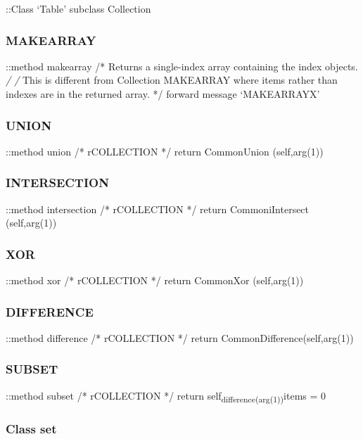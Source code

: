 ::Class `Table' subclass Collection

\hypertarget{makearray}{%
\subsubsection{MAKEARRAY}\label{makearray}}

::method makearray /* Returns a single-index array containing the index
objects. \emph{/ /} This is different from Collection MAKEARRAY where
items rather than indexes are in the returned array. */ forward message
`MAKEARRAYX'

\hypertarget{union}{%
\subsubsection{UNION}\label{union}}

::method union /* rCOLLECTION */ return CommonUnion (self,arg(1))

\hypertarget{intersection}{%
\subsubsection{INTERSECTION}\label{intersection}}

::method intersection /* rCOLLECTION */ return CommoniIntersect
(self,arg(1))

\hypertarget{xor}{%
\subsubsection{XOR}\label{xor}}

::method xor /* rCOLLECTION */ return CommonXor (self,arg(1))

\hypertarget{difference}{%
\subsubsection{DIFFERENCE}\label{difference}}

::method difference /* rCOLLECTION */ return
CommonDifference(self,arg(1))

\hypertarget{subset}{%
\subsubsection{SUBSET}\label{subset}}

::method subset /* rCOLLECTION */ return
self\textsubscript{difference(arg(1))}items = 0

\hypertarget{class-set}{%
\subsubsection{Class set}\label{class-set}}


